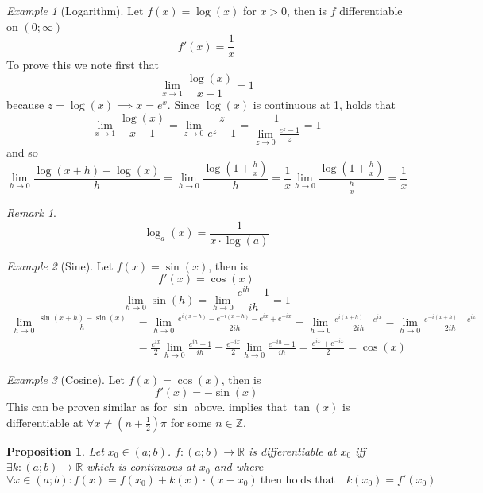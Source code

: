 \documentclass[english,titlepage]{uzhpub}
\theoremstyle{definition}
\theoremstyle{plain}
\newtheorem{proposition}[definition]{Proposition}
\theoremstyle{remark}
\newtheorem*{remark}{Remark}
\theoremstyle{example}
\newtheorem*{example}{Example}
\begin{document}
   \begin{example}[Logarithm]
      Let \(f(x) = \log(x)\) for \(x > 0\), then is \(f\) differentiable on \((0; \infty)\)
      \[f'(x) = \frac{1}{x}\]
      To prove this we note first that
      \[\lim_{x \to 1} \frac{\log(x)}{x - 1} = 1\]
      because \(z = \log(x) \implies x = e^x\).
      Since \(\log(x)\) is continuous at 1, holds that
      \[\lim_{x \to 1} \frac{\log(x)}{x - 1} = \lim_{z \to 0} \frac{z}{e^z - 1} = \frac{1}{\lim_{z \to 0} \frac{e^z -1}{z}} = 1\]
      and so
      \[\lim_{h \to 0} \frac{\log(x + h) - \log(x)}{h} = \lim_{h \to 0} \frac{\log(1 + \frac{h}{x})}{h} = \frac{1}{x} \lim_{h \to 0} \frac{\log(1 + \frac{h}{x})}{\frac{h}{x}} = \frac{1}{x}\]
   \end{example}
   \begin{remark} %
      \[\log_a(x) = \frac{1}{x \cdot \log(a)}\]
   \end{remark}

   \begin{example}[Sine]
      Let \(f(x) = \sin(x)\), then is
      \[f'(x) = \cos(x)\]
      \[\lim_{h \to 0} \sin(h) = \lim_{h \to 0} \frac{e^{ih} - 1}{ih} = 1\]
      \begin{equation*}
         \begin{split}
            \lim_{h \to 0} \frac{\sin(x + h) - \sin(x)}{h} & = \lim_{h \to 0} \frac{e^{i(x + h)} - e^{-i(x+h)} - e^{ix} + e^{-ix}}{2ih} = \lim_{h \to 0} \frac{e^{i(x+h)} - e^{ix}}{2ih} - \lim_{h\to 0} \frac{e^{-i(x+h)} - e^{ix}}{2ih}\\
                                                           & = \frac{e^{ix}}{2} \lim_{h \to 0} \frac{e^{ih} -1}{ih} - \frac{e^{-ix}}{2} \lim_{h \to 0} \frac{e^{-ih} - 1}{ih} = \frac{e^{ix} + e^{-ix}}{2} = \cos(x)
         \end{split}
      \end{equation*}
   \end{example}

   \begin{example}[Cosine]
      Let \(f(x) = \cos(x)\), then is
      \[f'(x) = -\sin(x)\]
      This can be proven similar as for \(\sin\) above.
       implies that \(\tan(x)\) is differentiable at \(\forall x \neq (n + \frac{1}{2})\pi\) for some \(n \in \mathbb{Z}\).
   \end{example}

   \begin{proposition}\label{pro:deriv_cont}
      Let \(x_0 \in (a;b)\).
      \(f: (a;b) \to \mathbb{R}\) is differentiable at \(x_0\) iff \(\exists k: (a;b) \to \mathbb{R}\) which is continuous at \(x_0\) and where
      \[\forall x \in (a;b): f(x) = f(x_0) + k(x) \cdot (x - x_0)~\text{then holds that} \quad k(x_0) = f'(x_0)\]
   \end{proposition}
\end{document}
